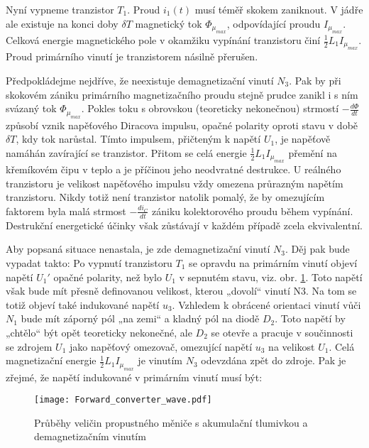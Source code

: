     Nyní vypneme tranzistor $T_1$. Proud $i_1(t)$ musí téměř skokem zaniknout. V jádře ale 
    existuje na konci doby $\delta T$ magnetický tok $\Phi_{\mu_{max}}$, odpovídající proudu 
    $I_{\mu_{max}}$. Celková energie magnetického pole v okamžiku vypínání tranzistoru činí 
    $\frac{1}{2}L_1I_{\mu_{max}}$. Proud primárního vinutí je tranzistorem násilně přerušen.
    
    Předpokládejme nejdříve, že neexistuje demagnetizační vinutí $N_3$. Pak by při skokovém zániku
    primárního magnetizačního proudu stejně prudce zanikl i s ním svázaný tok $\Phi_{\mu_{max}}$. 
    Pokles toku s obrovskou (teoreticky nekonečnou) strmostí $-\frac{d\Phi}{dt}$ způsobí vznik 
    napěťového Diracova impulsu, opačné polarity oproti stavu v době $\delta T$, kdy tok 
    narůstal. Tímto impulsem, přičteným k napětí $U_1$, je napěťově namáhán zavírající se 
    tranzistor. Přitom se celá energie $\frac{1}{2}L_1I_{\mu_{max}}$ přemění na křemíkovém čipu v 
    teplo a je příčinou jeho neodvratné destrukce. U reálného tranzistoru je velikost napěťového 
    impulsu vždy omezena průrazným napětím tranzistoru. Nikdy totiž není tranzistor natolik 
    pomalý, že by omezujícím faktorem byla malá strmost $-\frac{di_C}{dt}$ zániku kolektorového 
    proudu během vypínání. Destrukční energetické účinky však zůstávají v každém případě zcela 
    ekvivalentní.              
    
    Aby popsaná situace nenastala, je zde demagnetizační vinutí $N_3$. Děj pak bude vypadat 
    takto: Po vypnutí tranzistoru $T_1$ se opravdu na primárním vinutí objeví napětí $U_1'$ 
    opačné polarity, než bylo $U_1$ v sepnutém stavu, viz. obr. \ref{enz:fig_Forward_demag_wave}. 
    Toto napětí však bude mít přesně definovanou velikost, kterou „dovolí“ vinutí N3. Na tom se 
    totiž objeví také indukované napětí $u_3$. Vzhledem k obrácené orientaci vinutí vůči $N_1$ 
    bude mít záporný pól „na zemi“ a kladný pól na diodě $D_2$. Toto napětí by „chtělo“ být opět 
    teoreticky nekonečné, ale $D_2$ se otevře a pracuje v součinnosti se zdrojem  $U_1$ jako 
    napěťový omezovač, omezující napětí $u_3$ na velikost $U_1$. Celá magnetizační energie 
    $\frac{1}{2}L_1I_{\mu_{max}}$ je vinutím  $N_3$ odevzdána zpět do zdroje. Pak je zřejmé, že 
    napětí indukované v primárním vinutí musí být:
    
    \begin{figure}[ht!]
      \centering
      \texttt{[image: Forward\_converter\_wave.pdf]}
      \caption{Průběhy veličin propustného měniče s akumulační tlumivkou a demagnetizačním 
      vinutím}
      \label{enz:fig_Forward_demag_wave} 
    \end{figure}                          
    
